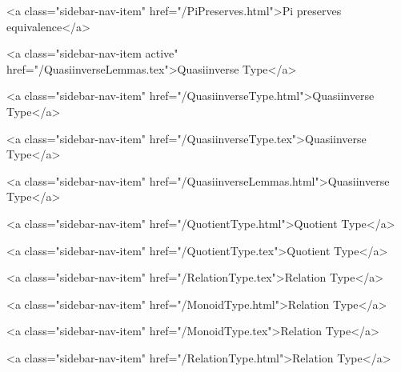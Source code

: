           <a class="sidebar-nav-item" href="/PiPreserves.html">Pi preserves equivalence</a>
        
      
    
      
        
          <a class="sidebar-nav-item active" href="/QuasiinverseLemmas.tex">Quasiinverse Type</a>
        
      
    
      
        
          <a class="sidebar-nav-item" href="/QuasiinverseType.html">Quasiinverse Type</a>
        
      
    
      
        
          <a class="sidebar-nav-item" href="/QuasiinverseType.tex">Quasiinverse Type</a>
        
      
    
      
        
          <a class="sidebar-nav-item" href="/QuasiinverseLemmas.html">Quasiinverse Type</a>
        
      
    
      
        
          <a class="sidebar-nav-item" href="/QuotientType.html">Quotient Type</a>
        
      
    
      
        
          <a class="sidebar-nav-item" href="/QuotientType.tex">Quotient Type</a>
        
      
    
      
        
          <a class="sidebar-nav-item" href="/RelationType.tex">Relation Type</a>
        
      
    
      
        
          <a class="sidebar-nav-item" href="/MonoidType.html">Relation Type</a>
        
      
    
      
        
          <a class="sidebar-nav-item" href="/MonoidType.tex">Relation Type</a>
        
      
    
      
        
          <a class="sidebar-nav-item" href="/RelationType.html">Relation Type</a>
        
      
    

